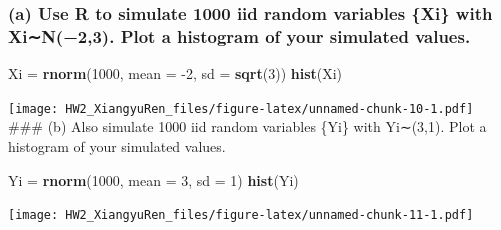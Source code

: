 \documentclass[
]{article}
\newenvironment{Shaded}{\begin{snugshade}}{\end{snugshade}}
\newcommand{\DataTypeTok}[1]{\textcolor[rgb]{0.13,0.29,0.53}{#1}}
\newcommand{\DecValTok}[1]{\textcolor[rgb]{0.00,0.00,0.81}{#1}}
\newcommand{\KeywordTok}[1]{\textcolor[rgb]{0.13,0.29,0.53}{\textbf{#1}}}
\newcommand{\NormalTok}[1]{#1}
\newcommand{\StringTok}[1]{\textcolor[rgb]{0.31,0.60,0.02}{#1}}
\begin{document}
\hypertarget{a-use-r-to-simulate-1000-iid-random-variables-xi-with-xin23.-plot-a-histogram-of-your-simulated-values.}{%
\subsubsection{(a) Use R to simulate 1000 iid random variables \{Xi\}
with Xi∼N(−2,3). Plot a histogram of your simulated
values.}\label{a-use-r-to-simulate-1000-iid-random-variables-xi-with-xin23.-plot-a-histogram-of-your-simulated-values.}}

\begin{Shaded}
\begin{Highlighting}[]
\NormalTok{Xi =}\StringTok{ }\KeywordTok{rnorm}\NormalTok{(}\DecValTok{1000}\NormalTok{, }\DataTypeTok{mean =} \DecValTok{-2}\NormalTok{, }\DataTypeTok{sd =} \KeywordTok{sqrt}\NormalTok{(}\DecValTok{3}\NormalTok{))}
\KeywordTok{hist}\NormalTok{(Xi)}
\end{Highlighting}
\end{Shaded}

\texttt{[image: HW2\_XiangyuRen\_files/figure-latex/unnamed-chunk-10-1.pdf]}
\#\#\# (b) Also simulate 1000 iid random variables \{Yi\} with Yi∼(3,1).
Plot a histogram of your simulated values.

\begin{Shaded}
\begin{Highlighting}[]
\NormalTok{Yi =}\StringTok{ }\KeywordTok{rnorm}\NormalTok{(}\DecValTok{1000}\NormalTok{, }\DataTypeTok{mean =} \DecValTok{3}\NormalTok{, }\DataTypeTok{sd =} \DecValTok{1}\NormalTok{)}
\KeywordTok{hist}\NormalTok{(Yi)}
\end{Highlighting}
\end{Shaded}

\texttt{[image: HW2\_XiangyuRen\_files/figure-latex/unnamed-chunk-11-1.pdf]}
\end{document}
